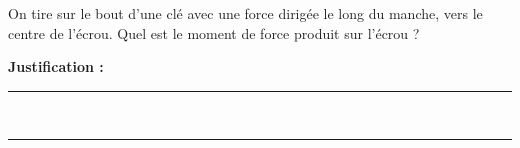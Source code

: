 On tire sur le bout d'une clé avec une force dirigée le long du manche, vers le centre de l'écrou. Quel est le moment de force produit sur l'écrou ?

\choices

\noindent\textbf{Justification :} \hrulefill \\[2.5ex]
\rule{\linewidth}{0.4pt} \\[2.5ex]
\rule{\linewidth}{0.4pt}
\vfill
